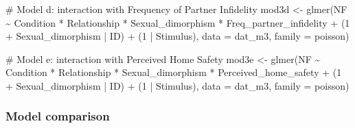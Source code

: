 \documentclass[
  bookmarksnumbered]{article}
\newenvironment{Shaded}{\begin{snugshade}}{\end{snugshade}}
\newcommand{\AttributeTok}[1]{\textcolor[rgb]{0.80,0.80,0.80}{#1}}
\newcommand{\CommentTok}[1]{\textcolor[rgb]{0.50,0.62,0.50}{#1}}
\newcommand{\DecValTok}[1]{\textcolor[rgb]{0.86,0.86,0.80}{#1}}
\newcommand{\FunctionTok}[1]{\textcolor[rgb]{0.94,0.94,0.56}{#1}}
\newcommand{\NormalTok}[1]{\textcolor[rgb]{0.80,0.80,0.80}{#1}}
\newcommand{\OtherTok}[1]{\textcolor[rgb]{0.94,0.94,0.56}{#1}}
\newcommand{\SpecialCharTok}[1]{\textcolor[rgb]{0.86,0.64,0.64}{#1}}
\newcommand{\StringTok}[1]{\textcolor[rgb]{0.80,0.58,0.58}{#1}}
\begin{document}
\begin{Shaded}
\begin{Highlighting}[]
\CommentTok{\# Model d: interaction with Frequency of Partner Infidelity}
\NormalTok{mod3d }\OtherTok{\textless{}{-}} \FunctionTok{glmer}\NormalTok{(NF }\SpecialCharTok{\textasciitilde{}}
\NormalTok{                Condition }\SpecialCharTok{*}\NormalTok{ Relationship }\SpecialCharTok{*}\NormalTok{ Sexual\_dimorphism }\SpecialCharTok{*}\NormalTok{ Freq\_partner\_infidelity }\SpecialCharTok{+}
\NormalTok{                (}\DecValTok{1} \SpecialCharTok{+}\NormalTok{ Sexual\_dimorphism }\SpecialCharTok{|}\NormalTok{ ID) }\SpecialCharTok{+}\NormalTok{ (}\DecValTok{1} \SpecialCharTok{|}\NormalTok{ Stimulus), }
              \AttributeTok{data =}\NormalTok{ dat\_m3,}
              \AttributeTok{family =}\NormalTok{ poisson)}

\CommentTok{\# Model e: interaction with Perceived Home Safety}
\NormalTok{mod3e }\OtherTok{\textless{}{-}} \FunctionTok{glmer}\NormalTok{(NF }\SpecialCharTok{\textasciitilde{}}
\NormalTok{                Condition }\SpecialCharTok{*}\NormalTok{ Relationship }\SpecialCharTok{*}\NormalTok{ Sexual\_dimorphism }\SpecialCharTok{*}\NormalTok{ Perceived\_home\_safety }\SpecialCharTok{+}
\NormalTok{                (}\DecValTok{1} \SpecialCharTok{+}\NormalTok{ Sexual\_dimorphism }\SpecialCharTok{|}\NormalTok{ ID) }\SpecialCharTok{+}\NormalTok{ (}\DecValTok{1} \SpecialCharTok{|}\NormalTok{ Stimulus), }
              \AttributeTok{data =}\NormalTok{ dat\_m3,}
              \AttributeTok{family =}\NormalTok{ poisson)}
\end{Highlighting}
\end{Shaded}

\subsubsection{Model comparison}\label{model-comparison-2}

\begin{Shaded}
\end{Shaded}
\end{document}
